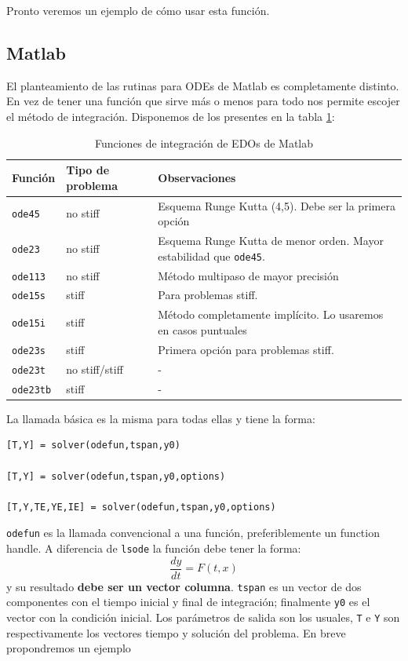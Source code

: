 Pronto veremos un ejemplo de cómo usar esta función.


\subsection{Matlab}

El planteamiento de las rutinas para ODEs de Matlab es completamente
distinto. En vez de tener una función que sirve más o menos para todo
nos permite escojer el método de integración. Disponemos de los presentes
en la tabla \ref{cap:Funciones-de-integraci=F3n}:

%
\begin{table}[H]
\centering{}\begin{tabular}{|m{2cm}|>{\centering}m{3cm}|>{\raggedright}p{10cm}|}
\hline 
Función&
Tipo de problema&
Observaciones\tabularnewline
\hline
\hline 
\texttt{ode45\index{ode45}}&
no stiff&
Esquema Runge Kutta (4,5). Debe ser la primera opción\tabularnewline
\hline 
\texttt{ode23\index{ode23}}&
no stiff&
Esquema Runge Kutta de menor orden. Mayor estabilidad que \texttt{ode45}.\tabularnewline
\hline 
\texttt{ode113\index{ode113}}&
no stiff&
Método multipaso de mayor precisión\tabularnewline
\hline 
\texttt{ode15s\index{ode15s}}&
stiff&
Para problemas stiff.\tabularnewline
\hline 
\texttt{ode15i\index{ode15i}}&
stiff&
Método completamente implícito. Lo usaremos en casos puntuales\tabularnewline
\hline 
\texttt{ode23s\index{ode23s}}&
stiff&
Primera opción para problemas stiff.\tabularnewline
\hline 
\texttt{ode23t\index{ode23t}}&
no stiff/stiff&
-\tabularnewline
\hline 
\texttt{ode23tb\index{ode23tb}}&
stiff&
-\tabularnewline
\hline
\end{tabular}


\caption{\label{cap:Funciones-de-integraci=F3n}Funciones de integración de
EDOs de Matlab}
\end{table}


La llamada básica es la misma para todas ellas y tiene la forma:

  \begin{verbatim}
[T,Y] = solver(odefun,tspan,y0)

[T,Y] = solver(odefun,tspan,y0,options)

[T,Y,TE,YE,IE] = solver(odefun,tspan,y0,options)
 \end{verbatim}
\texttt{odefun} es la llamada convencional a una función, preferiblemente
un function handle. A diferencia de \texttt{lsode} la función debe
tener la forma:
$$\frac{dy}{dt}=F(t,x)$$
y su resultado \textbf{debe ser un vector columna}. \texttt{tspan}
es un vector de dos componentes con el tiempo inicial y final de integración;
finalmente \texttt{y0} es el vector con la condición inicial. Los
parámetros de salida son los usuales, \texttt{T} e \texttt{Y} son
respectivamente los vectores tiempo y solución del problema. En breve
propondremos un ejemplo

